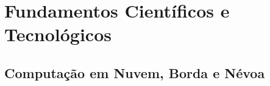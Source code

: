 \chapter{Fundamentos Científicos e Tecnológicos}
\label{cha:fundamentos}


\section{Computação em Nuvem, Borda e Névoa}





